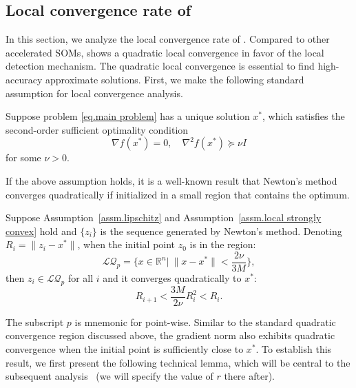 \documentclass[moor,sglanonrev]{informs4}
\begin{document}
\subsection{Local convergence rate of }
\label{sec.local}
In this section, we analyze the local convergence rate of . Compared to other accelerated SOMs,  shows a quadratic local convergence in favor of the local detection mechanism. The quadratic local convergence is essential to find high-accuracy approximate solutions. First, we make the following standard assumption for local convergence analysis.
\begin{assumption}
    \label{assm.local strongly convex}
    Suppose problem \eqref{eq.main problem} has a unique solution $x^*$, which satisfies the second-order sufficient optimality condition
    \begin{equation}
        \label{eq.second-order suff cond}
        \nabla f(x^*)=0, \quad \nabla^2 f(x^*)\succeq \nu I
    \end{equation}
    for some $\nu >0$.
\end{assumption}
If the above assumption holds, it is a well-known result that Newton's method converges quadratically if initialized in a small region that contains the optimum.
\begin{lemma}
    \label{lem.quadratic point}
    Suppose Assumption~\ref{assm.lipschitz} and Assumption~\ref{assm.local strongly convex} hold and $\{z_i\}$ is the sequence generated by Newton's method. Denoting $R_i = \|z_i-x^*\|$, when the initial point $z_0$ is in the region:
    \begin{equation}
        \label{eq.local quadratic region}
        \mathcal{LQ}_p = \{x\in\mathbb{R}^n| \ \|x-x^*\| < \frac{2\nu}{3M}\},
    \end{equation}
    then $z_i \in \mathcal{LQ}_p$ for all $i$ and it converges quadratically to $x^*$:
    \begin{equation}
        \label{eq.quadratic convergence}
        R_{i+1} < \frac{3M}{2\nu}R_i^2<R_i.
    \end{equation}
\end{lemma}
The subscript $p$ is mnemonic for point-wise. Similar to the standard quadratic convergence region discussed above, the gradient norm also exhibits quadratic convergence when the initial point is sufficiently close to $x^*$. To establish this result, we first present the following technical lemma, which will be central to the subsequent analysis~{\color{red} (we will specify the value of $r$ there after)}.
\end{document}
